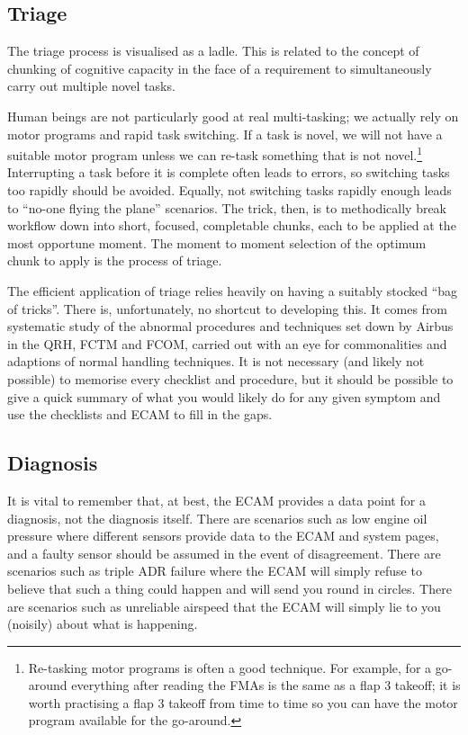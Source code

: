 \documentclass[a5paper,11pt,titlepage]{article}
\begin{document}
\subsection{Triage}
The triage process is visualised as a ladle. This is related to the
concept of chunking of cognitive capacity in the face of a requirement
to simultaneously carry out multiple novel tasks.

Human beings are not particularly good at real multi-tasking; we
actually rely on motor programs and rapid task switching. If a task is
novel, we will not have a suitable motor program unless we can re-task
something that is not novel.\footnote{Re-tasking motor programs is often
  a good technique. For example, for a go-around everything after
  reading the FMAs is the same as a flap 3 takeoff; it is worth
  practising a flap 3 takeoff from time to time so you can have the
  motor program available for the go-around.} Interrupting a task before
it is complete often leads to errors, so switching tasks too rapidly
should be avoided. Equally, not switching tasks rapidly enough leads to
``no-one flying the plane'' scenarios. The trick, then, is to
methodically break workflow down into short, focused, completable
chunks, each to be applied at the most opportune moment. The moment to
moment selection of the optimum chunk to apply is the process of triage.

The efficient application of triage relies heavily on having a suitably
stocked ``bag of tricks''. There is, unfortunately, no shortcut to
developing this. It comes from systematic study of the abnormal
procedures and techniques set down by Airbus in the QRH, FCTM and FCOM,
carried out with an eye for commonalities and adaptions of normal
handling techniques. It is not necessary (and likely not possible) to
memorise every checklist and procedure, but it should be possible to
give a quick summary of what you would likely do for any given symptom
and use the checklists and ECAM to fill in the gaps.

\subsection{Diagnosis}

It is vital to remember that, at best, the ECAM provides a data point
for a diagnosis, not the diagnosis itself. There are scenarios such as
low engine oil pressure where different sensors provide data to the ECAM
and system pages, and a faulty sensor should be assumed in the event of
disagreement. There are scenarios such as triple ADR failure where the
ECAM will simply refuse to believe that such a thing could happen and
will send you round in circles. There are scenarios such as unreliable
airspeed that the ECAM will simply lie to you (noisily) about what is
happening.
\end{document}
